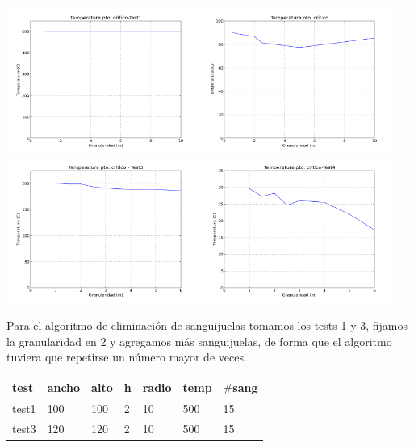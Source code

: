 \documentclass[a4paper]{article}
\begin{document}
\noindent \includegraphics[width=180pt]{img/temp1.png}\includegraphics[width=180pt]{img/temp2.png} \newline
\includegraphics[width=180pt]{img/temp3.png}\includegraphics[width=180pt]{img/temp4.png}

Para el algoritmo de eliminación de sanguijuelas tomamos los tests 1 y 3, fijamos la granularidad en 2 y agregamos más sanguijuelas, de forma que el algoritmo tuviera que repetirse un número mayor de veces. \\
  \begin{tabular}{ l|l l l l l l}
  test & ancho & alto & h & radio & temp & $\#$sang \\
  \hline
  test1 & 100 & 100 & 2 & 10 & 500 & 15 \\
  test3 & 120 & 120 & 2 & 10 & 500 & 15 
\end{tabular} 
\end{document}
